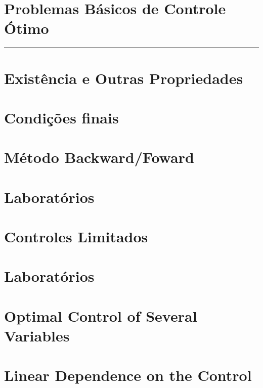 \documentclass[a4paper, 11pt, oneside]{book}
\begin{document}


\tableofcontents

\chapter{Problemas Básicos de Controle Ótimo}
\label{ch:1}
\rule{\textwidth}{1pt}


\chapter{Existência e Outras Propriedades}


\chapter{Condições finais}


\chapter{Método Backward/Foward}


\chapter{Laboratórios}


\chapter{Controles Limitados}


\chapter{Laboratórios}


\chapter{Optimal Control of Several Variables}


\chapter{Linear Dependence on the Control}




\end{document}
